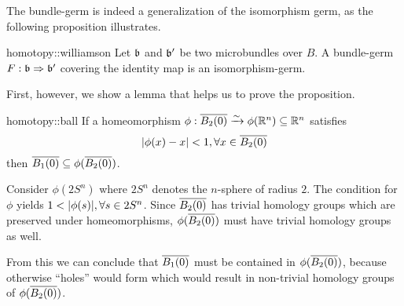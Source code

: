\begin{myparagraph}
    The bundle-germ is indeed a generalization of the isomorphism germ, as the following proposition illustrates.
\end{myparagraph}

\begin{myproposition}[Williamson]{homotopy::williamson}
    Let $\mathfrak{b}$ and $\mathfrak{b}'$ be two microbundles over $B$.
    A bundle-germ $F: \mathfrak{b} \Rightarrow{} \mathfrak{b}'$ covering the identity map is an isomorphism-germ.
\end{myproposition}

\begin{myparagraph}
    First, however, we show a lemma that helps us to prove the proposition.
\end{myparagraph}

\begin{mylemma}{homotopy::ball}
    If a homeomorphism $\phi: \clball[2] \isomto \phi(\R^n) \sub \R^n$ satisfies
    \[ \abs{\phi(x) - x} < 1, \forall x \in \clball[2] \]
    then $\clball[1] \sub \phi(\clball[2])$.
\end{mylemma}

\begin{myproof}
    Consider $\phi(2S^n)$ where $2S^n$ denotes the $n$-sphere of radius $2$.
    The condition for $\phi$ yields $1 < \vert{} \phi(s) \vert{}, \forall s \in 2S^n$.
    Since $\clball[2]$ has trivial homology groups which are preserved under homeomorphisms,
    $\phi(\clball[2])$ must have trivial homology groups as well.

    From this we can conclude that $\clball[1]$ must be contained in $\phi(\clball[2])$,
    because otherwise ``holes'' would form which would result in non-trivial homology groups of $\phi(\clball[2])$.
\end{myproof}


